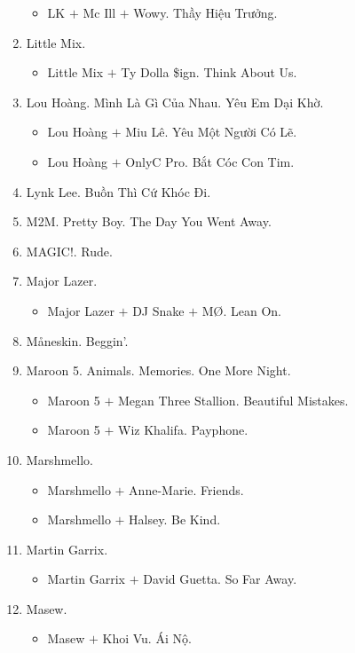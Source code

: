 \documentclass{article}
\begin{document}
\begin{enumerate}
\begin{itemize}
		\item {\sc LK $+$ Mc Ill $+$ Wowy.} Thầy Hiệu Trưởng.
	\end{itemize}
	\item {\sc Little Mix.}
	\begin{itemize}
		\item {\sc Little Mix $+$ Ty Dolla \$ign.} Think About Us.
	\end{itemize}
	\item {\sc Lou Hoàng.} Mình Là Gì Của Nhau. Yêu Em Dại Khờ.
	\begin{itemize}
		\item {\sc Lou Hoàng $+$ Miu Lê.} Yêu Một Người Có Lẽ.
		\item {\sc Lou Hoàng $+$ OnlyC Pro.} Bắt Cóc Con Tim.
	\end{itemize}
	\item {\sc Lynk Lee.} Buồn Thì Cứ Khóc Đi.
	\item {\sc M2M.} Pretty Boy. The Day You Went Away.
	\item {\sc MAGIC!.} Rude.
	\item {\sc Major Lazer.}
	\begin{itemize}
		\item {\sc Major Lazer $+$ DJ Snake $+$ M\O.} Lean On.
	\end{itemize}
	\item {\sc M\r{a}neskin.} Beggin'.
	\item {\sc Maroon 5.} Animals. Memories. One More Night.
	\begin{itemize}
		\item {\sc Maroon 5 $+$ Megan Three Stallion.} Beautiful Mistakes.
		\item {\sc Maroon 5 $+$ Wiz Khalifa.} Payphone.
	\end{itemize}
	\item {\sc Marshmello.}
	\begin{itemize}
		\item {\sc Marshmello $+$ Anne-Marie.} Friends.
		\item {\sc Marshmello $+$ Halsey.} Be Kind.
	\end{itemize}
	\item {\sc Martin Garrix.}
	\begin{itemize}
		\item {\sc Martin Garrix $+$ David Guetta.} So Far Away.
	\end{itemize}
	\item {\sc Masew.}
	\begin{itemize}
		\item {\sc Masew $+$ Khoi Vu.} Ái Nộ.

\end{itemize}
\end{enumerate}
\end{document}
